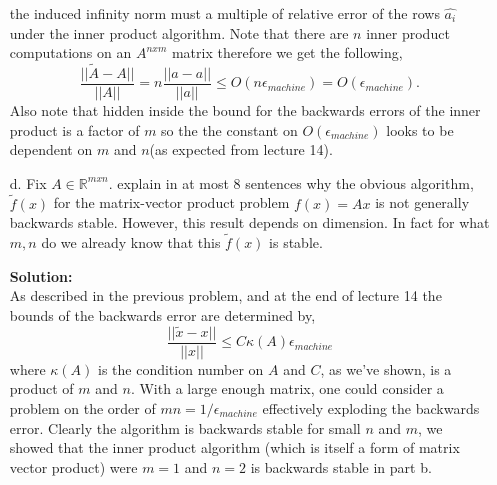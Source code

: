 \documentclass[12pt]{article}
\makeatletter
\theoremstyle{homework}
\newenvironment{exercise}[1]
{\def\@currentlabel{#1}\exercisecore}
{\endexercisecore}
\newcommand{\localhead}[1]{\par\smallskip\noindent\textbf{#1}\nobreak\\}%
\newcommand\solution{\localhead{Solution:}}
\newcommand{\Reals}{\ensuremath{\mathbb R}}
\newcommand{\emach}{\ensuremath{\epsilon_{machine}}}
\let\RR\Reals
\makeatother
\begin{document}
\begin{exercise}{P21}
\begin{enumerate}
  the induced infinity norm must a multiple of relative error of the rows $\hat{a_i}$ under the inner product algorithm. Note that there are $n$ inner product computations
  on an $A^{nxm}$ matrix therefore we get the following,
   \begin{equation*}
    \dfrac{||\tilde{A} - A||}{||A||} = n\dfrac{||\hat{a} - a||}{||a||} \leq O(n \emach) = O(\emach).
  \end{equation*}
  Also note that hidden inside the bound for the backwards errors of the inner product is a factor of $m$ so the the constant on $O(\emach)$ looks to be dependent on $m$ and $n$(as expected from lecture 14). 
  \vspace{.15in}

  \item[d.]Fix $A \in \RR^{mxn}$. explain in at most 8 sentences why the obvious algorithm, $\tilde{f}(x)$ for the matrix-vector product problem $f(x) = Ax$ is 
  not generally backwards stable. However, this result depends on dimension. In fact for what $m,n$ do we already know that this $\tilde{f}(x)$ is stable. \\
  \solution As described in the previous problem, and at the end of lecture 14 the bounds of the backwards error are determined by, 
  \begin{equation*}
    \dfrac{||\tilde{x} - x||}{||x||} \leq C \kappa(A)\emach
  \end{equation*}
  where $\kappa(A)$ is the condition number on $A$ and $C$, as we've shown, is a product of $m$ and $n$. With a large enough matrix, one could consider a problem on the order of 
  $mn = 1/\emach$ effectively exploding the backwards error. Clearly the algorithm is backwards stable for small $n$ and $m$, we showed that the inner product algorithm (which is itself 
  a form of matrix vector product) were $m = 1$ and $n = 2$ is backwards stable in part b. 
  \vspace{.15in}








\end{enumerate}

\end{exercise}


\vspace{1in}
\end{document}
